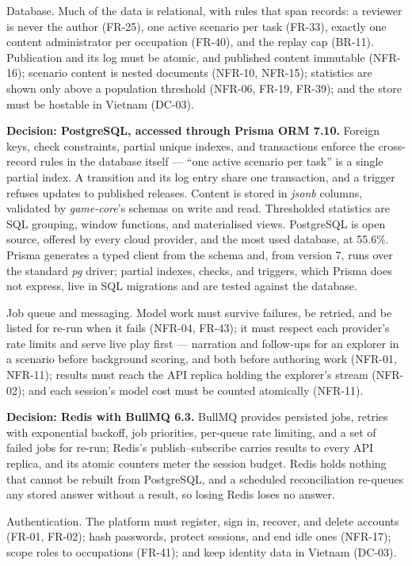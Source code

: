 Database. Much of the data is relational, with rules that span records: a reviewer is never the author (FR-25), one active scenario per task (FR-33), exactly one content administrator per occupation (FR-40), and the replay cap (BR-11). Publication and its log must be atomic, and published content immutable (NFR-16); scenario content is nested documents (NFR-10, NFR-15); statistics are shown only above a population threshold (NFR-06, FR-19, FR-39); and the store must be hostable in Vietnam (DC-03).

\textbf{Decision: PostgreSQL, accessed through Prisma ORM 7.10.} Foreign keys, check constraints, partial unique indexes, and transactions enforce the cross-record rules in the database itself --- ``one active scenario per task'' is a single partial index\cite{r153}. A transition and its log entry share one transaction, and a trigger refuses updates to published releases. Content is stored in \textit{jsonb} columns\cite{r154}, validated by \textit{game-core}'s schemas on write and read. Thresholded statistics are SQL grouping, window functions, and materialised views. PostgreSQL is open source, offered by every cloud provider, and the most used database, at 55.6\%\cite{r136}. Prisma generates a typed client from the schema and, from version 7, runs over the standard \textit{pg} driver\cite{r155}; partial indexes, checks, and triggers, which Prisma does not express, live in SQL migrations and are tested against the database.

Job queue and messaging. Model work must survive failures, be retried, and be listed for re-run when it fails (NFR-04, FR-43); it must respect each provider's rate limits and serve live play first --- narration and follow-ups for an explorer in a scenario before background scoring, and both before authoring work (NFR-01, NFR-11); results must reach the API replica holding the explorer's stream (NFR-02); and each session's model cost must be counted atomically (NFR-11).

\textbf{Decision: Redis with BullMQ 6.3.} BullMQ provides persisted jobs, retries with exponential backoff, job priorities, per-queue rate limiting, and a set of failed jobs for re-run\cite{r156}; Redis's publish--subscribe carries results to every API replica, and its atomic counters meter the session budget. Redis holds nothing that cannot be rebuilt from PostgreSQL, and a scheduled reconciliation re-queues any stored answer without a result, so losing Redis loses no answer.

Authentication. The platform must register, sign in, recover, and delete accounts (FR-01, FR-02); hash passwords, protect sessions, and end idle ones (NFR-17); scope roles to occupations (FR-41); and keep identity data in Vietnam (DC-03).

